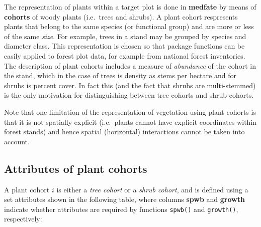 \documentclass[]{book}
\begin{document}
The representation of plants within a target plot is done in
\textbf{medfate} by means of \textbf{cohorts} of woody plants
(i.e.~trees and shrubs). A plant cohort respresents plants that belong
to the same species (or functional group) and are more or less of the
same \emph{size}. For example, trees in a stand may be grouped by
species and diameter class. This representation is chosen so that
package functions can be easily applied to forest plot data, for example
from national forest inventories. The description of plant cohorts
includes a measure of \emph{abundance} of the cohort in the stand, which
in the case of trees is density as stems per hectare and for shrubs is
percent cover. In fact this (and the fact that shrubs are multi-stemmed)
is the only motivation for distinguishing between tree cohorts and shrub
cohorts.

Note that one limitation of the representation of vegetation using plant
cohorts is that it is not spatially-explicit (i.e.~plants cannot have
explicit coordinates within forest stands) and hence spatial
(horizontal) interactions cannot be taken into account.

\subsection{Attributes of plant
cohorts}\label{attributes-of-plant-cohorts}

A plant cohort \(i\) is either a \emph{tree cohort} or a \emph{shrub
cohort}, and is defined using a set attributes shown in the following
table, where columns \textbf{spwb} and \textbf{growth} indicate whether
attributes are required by functions \texttt{spwb()} and
\texttt{growth()}, respectively:
\end{document}
